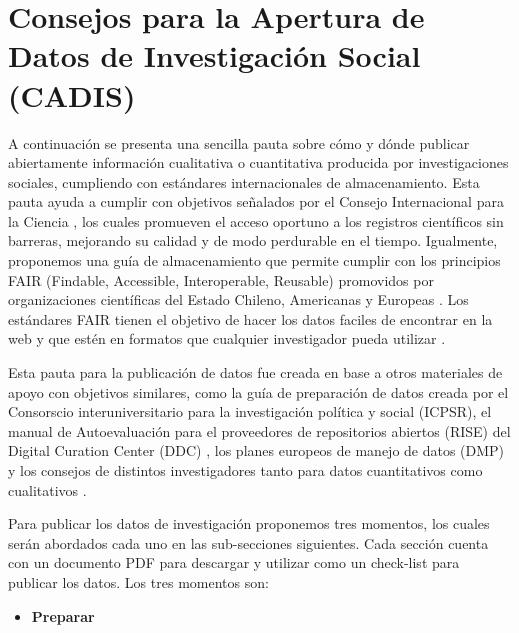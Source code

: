 \documentclass[
  14pt,
]{book}
\providecommand{\tightlist}{%
  \setlength{\itemsep}{0pt}\setlength{\parskip}{0pt}}
\begin{document}
\hypertarget{consejos-para-la-apertura-de-datos-de-investigaciuxf3n-social-cadis}{%
\chapter{Consejos para la Apertura de Datos de Investigación Social (CADIS)}\label{consejos-para-la-apertura-de-datos-de-investigaciuxf3n-social-cadis}}

A continuación se presenta una sencilla pauta sobre cómo y dónde publicar abiertamente información cualitativa o cuantitativa producida por investigaciones sociales, cumpliendo con estándares internacionales de almacenamiento. Esta pauta ayuda a cumplir con objetivos señalados por el Consejo Internacional para la Ciencia \citep{icsu_Open_2014}, los cuales promueven el acceso oportuno a los registros científicos sin barreras, mejorando su calidad y de modo perdurable en el tiempo. Igualmente, proponemos una guía de almacenamiento que permite cumplir con los principios FAIR (Findable, Accessible, Interoperable, Reusable) promovidos por organizaciones científicas del Estado Chileno, Americanas y Europeas \citep{anid_Con_2020, ramirez_Ciencia_2019, ec_FAIR_2016}. Los estándares FAIR tienen el objetivo de hacer los datos faciles de encontrar en la web y que estén en formatos que cualquier investigador pueda utilizar \citep{gofair_FAIR_2020}.

Esta pauta para la publicación de datos fue creada en base a otros materiales de apoyo con objetivos similares, como la guía de preparación de datos creada por el Consorscio interuniversitario para la investigación política y social (ICPSR), el manual de Autoevaluación para el proveedores de repositorios abiertos (RISE) del Digital Curation Center (DDC) \citep{ddc_Using_2017}, los planes europeos de manejo de datos (DMP) y los consejos de distintos investigadores tanto para datos cuantitativos como cualitativos \citetext{\citealp{ccsds_Recommendation_2012}; \citealp[@][]{kapiszewski_Transparency_2019}}.

Para publicar los datos de investigación proponemos tres momentos, los cuales serán abordados cada uno en las sub-secciones siguientes. Cada sección cuenta con un documento PDF para descargar y utilizar como un check-list para publicar los datos. Los tres momentos son:

\begin{itemize}
\tightlist
\item
  \textbf{Preparar}
\end{itemize}
\end{document}
